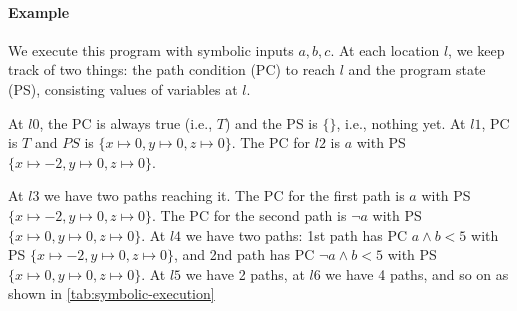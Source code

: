 \documentclass[oneside,11pt,dvipsnames]{book}
\begin{document}
\paragraph{Example} We execute this program with symbolic inputs $a, b, c$.  At each location $l$,  we keep track of two things: the path condition (PC) to reach $l$ and the program state (PS), consisting values of variables at $l$.

At $l0$, the PC is always true (i.e., $T$) and the PS is $\{\}
$, i.e., nothing yet. At $l1$, PC is $T$ and $PS$ is $\{x\mapsto 0, y\mapsto 0, z\mapsto 0\}$. The PC for $l2$ is $a$ with PS $\{x\mapsto -2,y\mapsto 0,z\mapsto 0\}$.  

At $l3$ we have two paths reaching it.  The PC for the first path is $a$ with PS $\{x\mapsto -2,y\mapsto 0,z\mapsto 0\}$. The PC for the second path is $\lnot a$ with PS $\{x\mapsto 0,y\mapsto 0,z\mapsto 0\}$.
At $l4$ we have two paths: 1st path has PC $a \land b < 5$ with PS $\{x\mapsto -2,y\mapsto 0,z\mapsto 0\}$, and 2nd path has PC $\lnot a \land b < 5$ with PS $\{x\mapsto 0,y\mapsto0,z\mapsto 0\}$. At $l5$ we have 2 paths, at $l6$ we have 4 paths, and so on as shown in \autoref{tab:symbolic-execution}
\end{document}
